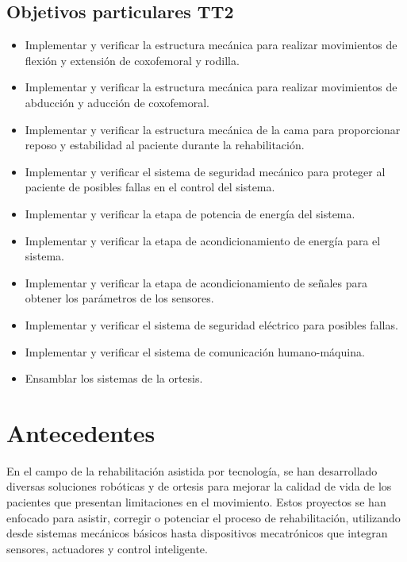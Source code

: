 \subsection{Objetivos particulares TT2}

\begin{itemize}
	\item	Implementar y verificar la estructura mecánica para realizar movimientos de flexión y extensión de coxofemoral y rodilla.
	\item	Implementar y verificar la estructura mecánica para realizar movimientos de abducción y aducción de coxofemoral. 
	\item	Implementar y verificar la estructura mecánica de la cama para proporcionar reposo y estabilidad al paciente durante la rehabilitación.
	\item	Implementar y verificar el sistema de seguridad mecánico para proteger al paciente de posibles fallas en el control del sistema.
	\item	Implementar y verificar la etapa de potencia de energía del sistema.
	\item	Implementar y verificar la etapa de acondicionamiento de energía para el sistema.
	\item	Implementar y verificar la etapa de acondicionamiento de señales para obtener los parámetros de los sensores. 
	\item	Implementar y verificar el sistema de seguridad eléctrico para posibles fallas.
	\item	Implementar y verificar el sistema de comunicación humano-máquina.
	\item	Ensamblar los sistemas de la ortesis.
\end{itemize}

\section{Antecedentes}
En el campo de la rehabilitación asistida por tecnología, se han desarrollado diversas soluciones robóticas y de ortesis para mejorar la calidad de vida de los pacientes que presentan limitaciones en el movimiento.
Estos proyectos se han enfocado para asistir, corregir o potenciar el proceso de rehabilitación, utilizando desde sistemas mecánicos básicos hasta dispositivos mecatrónicos que integran sensores, actuadores y control inteligente.

